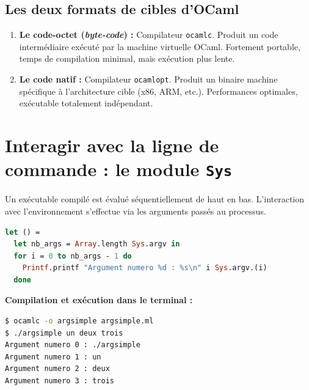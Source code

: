 \documentclass{article}
\begin{document}
\subsection{Les deux formats de cibles d'OCaml}

\begin{enumerate}
    \item \textbf{Le code-octet (\textit{byte-code}) : } Compilateur \texttt{ocamlc}. Produit un code intermédiaire exécuté par la machine virtuelle OCaml. Fortement portable, temps de compilation minimal, mais exécution plus lente.
    \item \textbf{Le code natif : } Compilateur \texttt{ocamlopt}. Produit un binaire machine spécifique à l'architecture cible (x86, ARM, etc.). Performances optimales, exécutable totalement indépendant.
\end{enumerate}

\section{Interagir avec la ligne de commande : le module \texttt{Sys}}

Un exécutable compilé est évalué séquentiellement de haut en bas. L'interaction avec l'environnement s'effectue via les arguments passés au processus.


\begin{lstlisting}[language=Caml]
let () =
  let nb_args = Array.length Sys.argv in
  for i = 0 to nb_args - 1 do
    Printf.printf "Argument numero %d : %s\n" i Sys.argv.(i)
  done
\end{lstlisting}

\noindent\textbf{Compilation et exécution dans le terminal :}
\begin{lstlisting}[language=bash]
$ ocamlc -o argsimple argsimple.ml
$ ./argsimple un deux trois
Argument numero 0 : ./argsimple
Argument numero 1 : un
Argument numero 2 : deux
Argument numero 3 : trois
\end{lstlisting}
\end{document}
